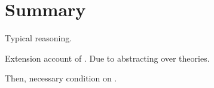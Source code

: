 \section{Summary}
\label{cha:typical:sec:summ}

\begin{note}
  Typical reasoning.

  Extension account of \tor{}.
  Due to abstracting over theories.

  Then, necessary condition on \tR{}.
\end{note}



\newpage







